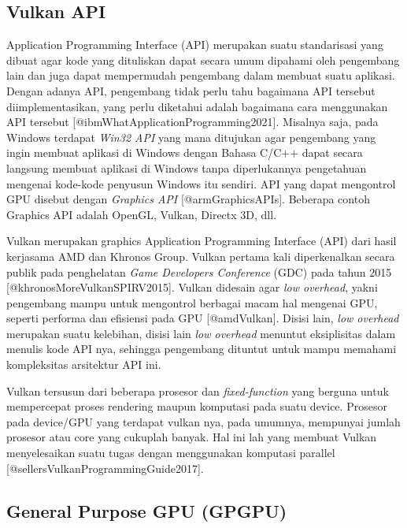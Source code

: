 \hypertarget{vulkan-api}{%
	\subsection{Vulkan API}\label{vulkan-api}}

Application Programming Interface (API) merupakan suatu standarisasi
yang dibuat agar kode yang dituliskan dapat secara umum dipahami oleh
pengembang lain dan juga dapat mempermudah pengembang dalam membuat
suatu aplikasi. Dengan adanya API, pengembang tidak perlu tahu bagaimana
API tersebut diimplementasikan, yang perlu diketahui adalah bagaimana
cara menggunakan API tersebut {[}@ibmWhatApplicationProgramming2021{]}.
Misalnya saja, pada Windows terdapat \emph{Win32 API} yang mana
ditujukan agar pengembang yang ingin membuat aplikasi di Windows dengan
Bahasa C/C++ dapat secara langsung membuat aplikasi di Windows tanpa
diperlukannya pengetahuan mengenai kode-kode penyusun Windows itu
sendiri. API yang dapat mengontrol GPU disebut dengan \emph{Graphics
API} {[}@armGraphicsAPIs{]}. Beberapa contoh Graphics API adalah OpenGL,
Vulkan, Directx 3D, dll.

Vulkan merupakan graphics Application Programming Interface (API)
dari hasil kerjasama AMD dan Khronos Group. Vulkan pertama kali
diperkenalkan secara publik pada penghelatan \emph{Game Developers
	Conference} (GDC) pada tahun 2015 {[}@khronosMoreVulkanSPIRV2015{]}.
Vulkan didesain agar \emph{low overhead}, yakni pengembang mampu untuk
mengontrol berbagai macam hal mengenai GPU, seperti performa dan
efisiensi pada GPU {[}@amdVulkan{]}. Disisi lain, \emph{low overhead}
merupakan suatu kelebihan, disisi lain \emph{low overhead} menuntut
eksiplisitas dalam menulis kode API nya, sehingga pengembang dituntut
untuk mampu memahami kompleksitas arsitektur API ini.

Vulkan tersusun dari beberapa prosesor dan \emph{fixed-function} yang
berguna untuk mempercepat proses rendering maupun komputasi pada suatu
device. Prosesor pada device/GPU yang terdapat vulkan nya, pada umumnya,
mempunyai jumlah prosesor atau core yang cukuplah banyak. Hal ini lah
yang membuat Vulkan menyelesaikan suatu tugas dengan menggunakan
komputasi parallel {[}@sellersVulkanProgrammingGuide2017{]}.

\hypertarget{general-purpose-gpu-gpgpu}{%
	\subsection{General Purpose GPU
		(GPGPU)}\label{general-purpose-gpu-gpgpu}}

